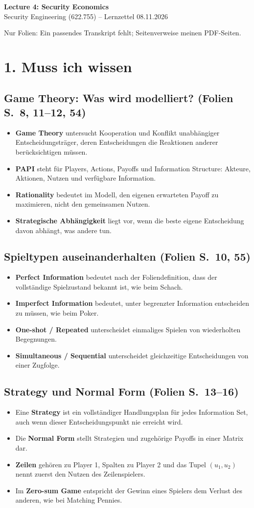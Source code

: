 \documentclass[11pt,a4paper]{article}
\newcommand{\block}[2]{\subsection*{#1 {\normalfont\small (Folien S.~#2)}}}
\begin{document}
\begin{center}
{\Large\bfseries Lecture 4: Security Economics}\\[3pt]
Security Engineering (622.755) -- Lernzettel 08.11.2026
\end{center}
{\small Nur Folien: Ein passendes Transkript fehlt; Seitenverweise meinen PDF-Seiten.}
\section*{1. Muss ich wissen}
\block{Game Theory: Was wird modelliert?}{8, 11--12, 54}
\begin{itemize}
\item \textbf{Game Theory} untersucht Kooperation und Konflikt unabhängiger Entscheidungsträger, deren Entscheidungen die Reaktionen anderer berücksichtigen müssen.
\item \textbf{PAPI} steht für Players, Actions, Payoffs und Information Structure: Akteure, Aktionen, Nutzen und verfügbare Information.
\item \textbf{Rationality} bedeutet im Modell, den eigenen erwarteten Payoff zu maximieren, nicht den gemeinsamen Nutzen.
\item \textbf{Strategische Abhängigkeit} liegt vor, wenn die beste eigene Entscheidung davon abhängt, was andere tun.
\end{itemize}
\block{Spieltypen auseinanderhalten}{10, 55}
\begin{itemize}
\item \textbf{Perfect Information} bedeutet nach der Foliendefinition, dass der vollständige Spielzustand bekannt ist, wie beim Schach.
\item \textbf{Imperfect Information} bedeutet, unter begrenzter Information entscheiden zu müssen, wie beim Poker.
\item \textbf{One-shot / Repeated} unterscheidet einmaliges Spielen von wiederholten Begegnungen.
\item \textbf{Simultaneous / Sequential} unterscheidet gleichzeitige Entscheidungen von einer Zugfolge.
\end{itemize}
\block{Strategy und Normal Form}{13--16}
\begin{itemize}
\item Eine \textbf{Strategy} ist ein vollständiger Handlungsplan für jedes Information Set, auch wenn dieser Entscheidungspunkt nie erreicht wird.
\item Die \textbf{Normal Form} stellt Strategien und zugehörige Payoffs in einer Matrix dar.
\item \textbf{Zeilen} gehören zu Player 1, Spalten zu Player 2 und das Tupel $(u_1,u_2)$ nennt zuerst den Nutzen des Zeilenspielers.
\item Im \textbf{Zero-sum Game} entspricht der Gewinn eines Spielers dem Verlust des anderen, wie bei Matching Pennies.
\end{itemize}
\end{document}
